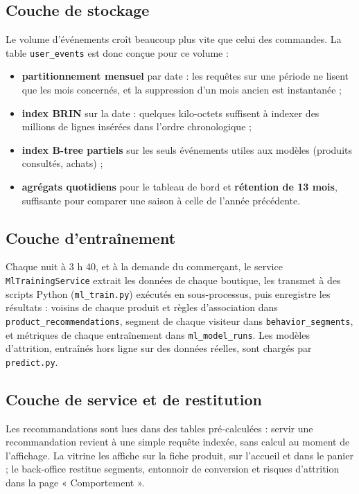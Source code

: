 \subsection{Couche de stockage}
Le volume d'événements croît beaucoup plus vite que celui des commandes. La table \texttt{user\_events} est donc conçue pour ce volume :
\begin{itemize}
  \item \textbf{partitionnement mensuel} par date : les requêtes sur une période ne lisent que les mois concernés, et la suppression d'un mois ancien est instantanée ;
  \item \textbf{index BRIN} sur la date : quelques kilo-octets suffisent à indexer des millions de lignes insérées dans l'ordre chronologique ;
  \item \textbf{index B-tree partiels} sur les seuls événements utiles aux modèles (produits consultés, achats) ;
  \item \textbf{agrégats quotidiens} pour le tableau de bord et \textbf{rétention de 13 mois}, suffisante pour comparer une saison à celle de l'année précédente.
\end{itemize}

\subsection{Couche d'entraînement}
Chaque nuit à 3 h 40, et à la demande du commerçant, le service \texttt{MlTrainingService} extrait les données de chaque boutique, les transmet à des scripts Python (\texttt{ml\_train.py}) exécutés en sous-processus, puis enregistre les résultats : voisins de chaque produit et règles d'association dans \texttt{product\_recommendations}, segment de chaque visiteur dans \texttt{behavior\_segments}, et métriques de chaque entraînement dans \texttt{ml\_model\_runs}. Les modèles d'attrition, entraînés hors ligne sur des données réelles, sont chargés par \texttt{predict.py}.

\subsection{Couche de service et de restitution}
Les recommandations sont lues dans des tables pré-calculées : servir une recommandation revient à une simple requête indexée, sans calcul au moment de l'affichage. La vitrine les affiche sur la fiche produit, sur l'accueil et dans le panier ; le back-office restitue segments, entonnoir de conversion et risques d'attrition dans la page « Comportement ».

